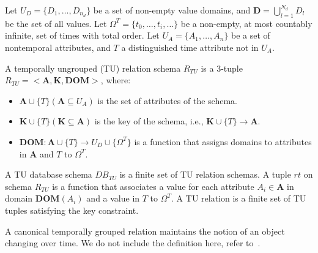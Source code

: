 \begin{definition}  Let $U_D =
\{D_1,\ldots,D_{n_d}\}$ be a set of non-empty value domains, and
$\mathbf{D} = \bigcup^{N_d}_{l=1}D_l$ be the set of all values. Let
$\Omega^T = \{t_0,\ldots,t_i,\ldots\}$ be a non-empty, at most countably
infinite, set of times with total order.  Let $U_A =
\{A_1,\ldots,A_n\}$ be a set of nontemporal attributes, and $T$ a
distinguished time attribute not in $U_A$.

A temporally ungrouped (TU) relation schema $R_{TU}$ is a 3-tuple
$R_{TU} = <\mathbf{A},\mathbf{K},\mathbf{DOM}>$, where:

\begin{itemize}[noitemsep,itemindent=\dimexpr{}+\relax,leftmargin=5pt]
\item $\mathbf{A} \cup \{T\} (\mathbf{A} \subseteq U_A)$ is the set of attributes of the schema.
\item $\mathbf{K} \cup \{T\} (\mathbf{K} \subseteq \mathbf{A})$ is the key of the schema, i.e., $\mathbf{K} \cup \{T\} \to \mathbf{A}$.
\item $\mathbf{DOM}: \mathbf{A} \cup \{T\} \to U_D \cup \{\Omega^T\}$ is a function that assigns domains to attributes in $\mathbf{A}$ and $T$ to $\Omega^T$.
\end{itemize}

A TU database schema $DB_{TU}$ is a finite set of TU relation schemas.
A tuple $rt$ on schema $R_{TU}$ is a function that associates a value
for each attribute $A_i \in \mathbf{A}$ in domain $\mathbf{DOM}(A_i)$
and a value in $T$ to $\Omega^T$.  A TU relation is a finite set of TU
tuples satisfying the key constraint.
\end{definition}


A canonical temporally grouped relation maintains the notion of an
object changing over time.  We do not include the definition here, refer to~\cite{Clifford1994}.

